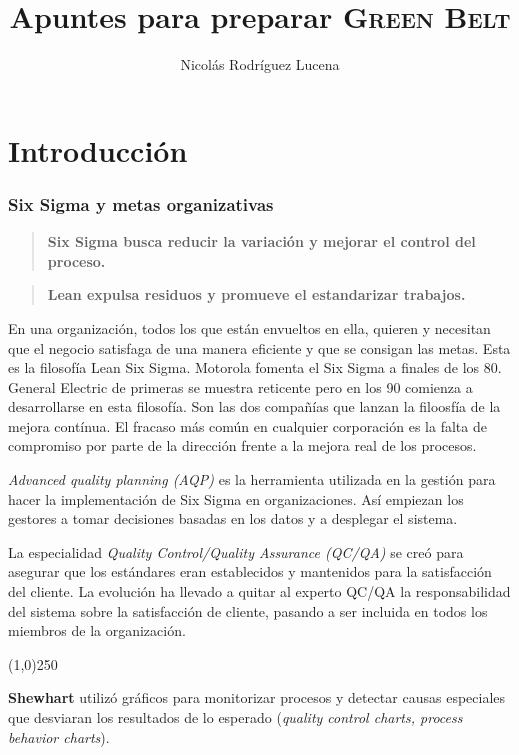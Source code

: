 \documentclass[]{article}
\title{Apuntes para preparar \textsc{Green Belt}}
\author{Nicolás Rodríguez Lucena}
\begin{document}
\maketitle

\part{Introducción}
\section{Six Sigma y metas organizativas}

\begin{quote}
	\textbf{Six Sigma busca reducir la variación y mejorar el control del proceso.}
\end{quote}
\begin{quote}
\textbf{Lean expulsa residuos y promueve el estandarizar trabajos.}
\end{quote}

En una organización, todos los que están envueltos en ella, quieren y necesitan que el negocio satisfaga de una manera eficiente y que se consigan las metas. Esta es la filosofía Lean Six Sigma.
Motorola fomenta el Six Sigma a finales de los 80. General Electric de primeras se muestra reticente pero en los 90 comienza a desarrollarse en esta filosofía. Son las dos compañías que lanzan la filoosfía de la mejora contínua. El fracaso más común en cualquier corporación es la falta de compromiso por parte de la dirección frente a la mejora real de los procesos.

\textit{Advanced quality planning (AQP)} es la herramienta utilizada en la gestión para hacer la implementación de Six Sigma en organizaciones. Así empiezan los gestores a tomar decisiones basadas en los datos y a desplegar el sistema.

La especialidad \textit{Quality Control/Quality Assurance (QC/QA)} se creó para asegurar que los estándares eran establecidos y mantenidos para la satisfacción del cliente. La evolución ha llevado a quitar al experto QC/QA la responsabilidad del sistema sobre la satisfacción de cliente, pasando a ser incluida en todos los miembros de la organización. 

\begin{center}
	\line(1,0){250}
\end{center}

\textbf{Shewhart} utilizó gráficos para monitorizar procesos y detectar causas especiales que desviaran los resultados de lo esperado (\textit{quality control charts, process behavior charts}).
\end{document}
